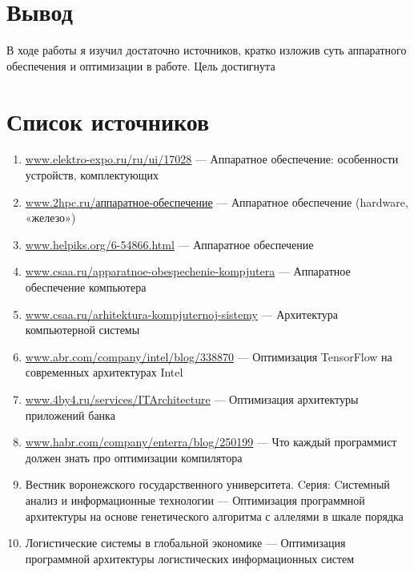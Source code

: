 \documentclass[12pt]{article}
\begin{document}
	\section*{Вывод}
	В ходе работы я изучил достаточно источников, кратко изложив суть аппаратного обеспечения и оптимизации в работе. Цель достигнута
	
	\newpage
	\section*{Список источников}
\begin{enumerate}[wide, labelwidth=!, labelindent=0pt]
\item \href{https://www.elektro-expo.ru/ru/ui/17028/}{www.elektro-expo.ru/ru/ui/17028} --- Аппаратное обеспечение: особенности устройств, комплектующих 
\item \href{https://www.2hpc.ru/аппаратное-обеспечение/}{www.2hpc.ru/аппаратное-обеспечение} --- Аппаратное обеспечение (hardware, «железо»)
\item \href{https://www.helpiks.org/6-54866.html}{www.helpiks.org/6-54866.html} --- Аппаратное обеспечение
\item \href{http://csaa.ru/apparatnoe-obespechenie-kompjutera/}{www.csaa.ru/apparatnoe-obespechenie-kompjutera} --- Аппаратное обеспечение компьютера
\item \href{http://csaa.ru/arhitektura-kompjuternoj-sistemy/}{www.csaa.ru/arhitektura-kompjuternoj-sistemy} --- Архитектура компьютерной системы
\item \href{https://habr.com/company/intel/blog/338870/}{www.abr.com/company/intel/blog/338870} --- Оптимизация TensorFlow на современных архитектурах Intel
\item \href{http://4by4.ru/services/ITArchitecture}{www.4by4.ru/services/ITArchitecture} --- Оптимизация архитектуры приложений банка
\item \href{https://habr.com/company/enterra/blog/250199/}{www.habr.com/company/enterra/blog/250199} --- Что каждый программист должен знать про оптимизации компилятора
\item Вестник воронежского государственного университета. Cерия: Cистемный анализ и информационные технологии  --- Оптимизация программной архитектуры на основе генетического алгоритма с аллелями в шкале порядка
\item Логистические системы в глобальной экономике --- Оптимизация программной архитектуры логистических информационных систем
\end{enumerate} 
\end{document}
